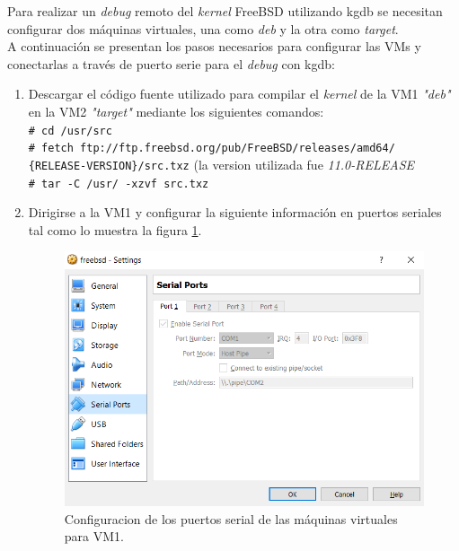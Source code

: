 \documentclass[a4paper]{book}
\begin{document}
Para realizar un \emph{debug} remoto del \emph{kernel} FreeBSD utilizando kgdb se necesitan configurar dos máquinas virtuales, una como \emph{deb} y la otra como \emph{target}.\\

A continuación se presentan los pasos necesarios para configurar las VMs y conectarlas a través de puerto serie para el \emph{debug} con kgdb:
\begin{enumerate}
\item Descargar el c\'odigo fuente utilizado para compilar el \emph{kernel} de la VM1 \emph{"deb"} en la VM2 \emph{"target"} mediante los siguientes comandos:\\
\verb|# cd /usr/src|\\
\verb|# fetch ftp://ftp.freebsd.org/pub/FreeBSD/releases/amd64/|\\
\verb|{RELEASE-VERSION}/src.txz| (la version utilizada fue \emph{11.0-RELEASE}\\
\verb|# tar -C /usr/ -xzvf src.txz|\\
\item Dirigirse a la VM1 y configurar la siguiente informaci\'on en puertos seriales tal como lo muestra la figura \ref{Fig:conf1}.

\begin{figure}
	\begin{center}
		\includegraphics[scale=0.7]{./imagenes/configuracionserial.png}
		\caption{Configuracion de los puertos serial de las m\'aquinas virtuales para VM1.}
		\label{Fig:conf1}
	\end{center}
\end{figure}


\end{enumerate}
\end{document}
